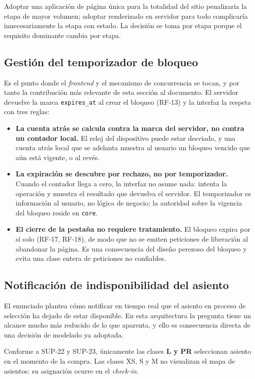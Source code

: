\documentclass[10pt,letterpaper]{article}
\begin{document}
Adoptar una aplicación de página única para la totalidad del sitio penalizaría la etapa de mayor volumen; adoptar renderizado en servidor para todo complicaría innecesariamente la etapa con estado. La decisión se toma por etapa porque el requisito dominante cambia por etapa.

\subsection{Gestión del temporizador de bloqueo}
Es el punto donde el \emph{frontend} y el mecanismo de concurrencia se tocan, y por tanto la contribución más relevante de esta sección al documento. El servidor devuelve la marca \texttt{expires\_at} al crear el bloqueo (RF-13) y la interfaz la respeta con tres reglas:

\begin{itemize}
  \item \textbf{La cuenta atrás se calcula contra la marca del servidor, no contra un contador local.} El reloj del dispositivo puede estar desviado, y una cuenta atrás local que se adelanta muestra al usuario un bloqueo vencido que aún está vigente, o al revés.
  \item \textbf{La expiración se descubre por rechazo, no por temporizador.} Cuando el contador llega a cero, la interfaz no asume nada: intenta la operación y muestra el resultado que devuelva el servidor. El temporizador es información al usuario, no lógica de negocio; la autoridad sobre la vigencia del bloqueo reside en \texttt{core}.
  \item \textbf{El cierre de la pestaña no requiere tratamiento.} El bloqueo expira por sí solo (RF-17, RF-18), de modo que no se emiten peticiones de liberación al abandonar la página. Es una consecuencia del diseño perezoso del bloqueo y evita una clase entera de peticiones no confiables.
\end{itemize}

\subsection{Notificación de indisponibilidad del asiento}
El enunciado plantea cómo notificar en tiempo real que el asiento en proceso de selección ha dejado de estar disponible. En esta arquitectura la pregunta tiene un alcance mucho más reducido de lo que aparenta, y ello es consecuencia directa de una decisión de modelado ya adoptada.

Conforme a SUP-22 y SUP-23, únicamente las clases \textbf{L y PR} seleccionan asiento en el momento de la compra. Las clases XS, S y M no visualizan el mapa de asientos: su asignación ocurre en el \emph{check-in}.
\end{document}
